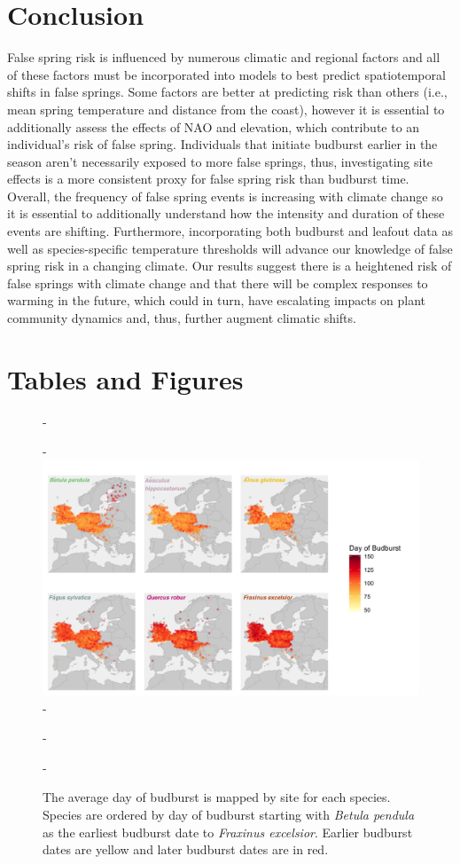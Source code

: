\documentclass{article}\usepackage[]{graphicx}\usepackage[]{color}
\begin{document}
\section*{Conclusion}
False spring risk is influenced by numerous climatic and regional factors and all of these factors must be incorporated into models to best predict spatiotemporal shifts in false springs. Some factors are better at predicting risk than others (i.e., mean spring temperature and distance from the coast), however it is essential to additionally assess the effects of NAO and elevation, which contribute to an individual's risk of false spring. Individuals that initiate budburst earlier in the season aren't necessarily exposed to more false springs, thus, investigating site effects is a more consistent proxy for false spring risk than budburst time. Overall, the frequency of false spring events is increasing with climate change so it is essential to additionally understand how the intensity and duration of these events are shifting. Furthermore, incorporating both budburst and leafout data as well as species-specific temperature thresholds will advance our knowledge of false spring risk in a changing climate. Our results suggest there is a heightened risk of false springs with climate change and that there will be complex responses to warming in the future, which could in turn, have escalating impacts on plant community dynamics and, thus, further augment climatic shifts.  




\section*{Tables and Figures} 

{\begin{figure} [H]
  -\begin{center}
  -\includegraphics[width=14cm]{..//figures/BB_base.png}
  -\caption{The average day of budburst is mapped by site for each species. Species are ordered by day of budburst starting with \textit{Betula pendula} as the earliest budburst date to \textit{Fraxinus excelsior}. Earlier budburst dates are yellow and later budburst dates are in red. }\label{fig:bbmap}
  -\end{center}
  -\end{figure}}
  
\end{document}

